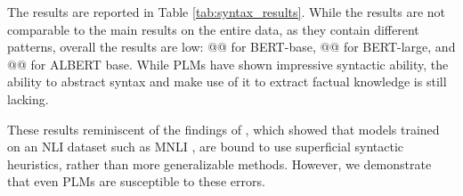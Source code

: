 The results are reported in Table \ref{tab:syntax_results}.  While the results are not comparable to the main results on the entire data, as they contain different patterns, overall the results are low: @@ for BERT-base, @@ for BERT-large, and @@ for ALBERT base. 
While PLMs have shown impressive syntactic ability, the ability to abstract syntax and make use of it to extract factual knowledge is still lacking.

These results reminiscent of the findings of \citet{mccoy2019right}, which showed that models trained on an NLI dataset \cite{dagan-rte,snli} such as MNLI \cite{mnli}, are bound to use superficial syntactic heuristics, rather than more generalizable methods.
However, we demonstrate that even PLMs are susceptible to these errors. 